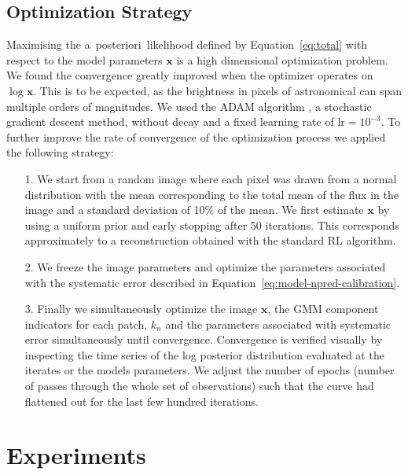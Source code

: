 \documentclass[twocolumn, lineno]{aastex631}
\newcommand{\aposteriori}{a~posteriori~}
\begin{document}
    \subsection{Optimization Strategy}
    \label{sec:opt-strategy}
    Maximising the \aposteriori likelihood defined by Equation~\ref{eq:total} with respect to the model parameters $\mathbf{x}$ is a high dimensional optimization problem. We found the convergence greatly improved when the optimizer operates on $\log{\mathbf{x}}$. This is to be expected, as the brightness in pixels of astronomical can span multiple orders of magnitudes. We used the ADAM algorithm \citep{Kingma2014}, a stochastic gradient descent method, without decay and a fixed learning rate of $\mathrm{lr}=10^{-3}$. To further improve the rate of convergence of the optimization process we applied the following strategy:

    \begin{itemize}
        \item[1.] We start from a random image where each pixel was drawn from a normal distribution with the mean corresponding to the total mean of the flux in the image and a standard deviation of 10\% of the mean. We first estimate $\mathbf{x}$ by using a uniform prior and early stopping after 50 iterations. This corresponds approximately to a reconstruction obtained with the standard RL algorithm. 
        \item[2.] We freeze the image parameters and optimize the parameters associated with the systematic error described in Equation~\ref{eq:model-npred-calibration}.
        \item[3.] Finally we simultaneously optimize
        the image $\mathbf{x}$, the GMM component indicators for each patch, $k_n$ and the parameters associated with systematic error simultaneously until convergence. Convergence is verified visually by inspecting the time series of the log posterior distribution evaluated at the iterates or the models parameters. We adjust the number of epochs (number of passes through the whole set of observations) such that the curve had flattened out for the last few hundred iterations.
    \end{itemize}
    
    \section{Experiments}
\end{document}

